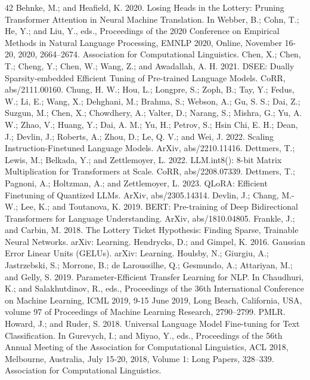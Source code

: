 \documentclass[11pt,a4paper]{article}
\begin{document}
\begin{thebibliography}{42}
 Behnke, M.; and Heafield, K. 2020. Losing Heads in the Lottery: Pruning Transformer Attention in Neural Machine Translation. In Webber, B.; Cohn, T.; He, Y.; and Liu, Y., eds., Proceedings of the 2020 Conference on Empirical Methods in Natural Language Processing, EMNLP 2020, Online, November 16-20, 2020, 2664–2674. Association for Computational Linguistics.
 Chen, X.; Chen, T.; Cheng, Y.; Chen, W.; Wang, Z.; and Awadallah, A. H. 2021. DSEE: Dually Sparsity-embedded Efficient Tuning of Pre-trained Language Models. CoRR, abs/2111.00160.
 Chung, H. W.; Hou, L.; Longpre, S.; Zoph, B.; Tay, Y.; Fedus, W.; Li, E.; Wang, X.; Dehghani, M.; Brahma, S.; Webson, A.; Gu, S. S.; Dai, Z.; Suzgun, M.; Chen, X.; Chowdhery, A.; Valter, D.; Narang, S.; Mishra, G.; Yu, A. W.; Zhao, V.; Huang, Y.; Dai, A. M.; Yu, H.; Petrov, S.; Hsin Chi, E. H.; Dean, J.; Devlin, J.; Roberts, A.; Zhou, D.; Le, Q. V.; and Wei, J. 2022. Scaling Instruction-Finetuned Language Models. ArXiv, abs/2210.11416.
 Dettmers, T.; Lewis, M.; Belkada, Y.; and Zettlemoyer, L. 2022. LLM.int8(): 8-bit Matrix Multiplication for Transformers at Scale. CoRR, abs/2208.07339.
 Dettmers, T.; Pagnoni, A.; Holtzman, A.; and Zettlemoyer, L. 2023. QLoRA: Efficient Finetuning of Quantized LLMs. ArXiv, abs/2305.14314.
 Devlin, J.; Chang, M.-W.; Lee, K.; and Toutanova, K. 2019. BERT: Pre-training of Deep Bidirectional Transformers for Language Understanding. ArXiv, abs/1810.04805.
 Frankle, J.; and Carbin, M. 2018. The Lottery Ticket Hypothesis: Finding Sparse, Trainable Neural Networks. arXiv: Learning.
 Hendrycks, D.; and Gimpel, K. 2016. Gaussian Error Linear Units (GELUs). arXiv: Learning.
 Houlsby, N.; Giurgiu, A.; Jastrzebski, S.; Morrone, B.; de Laroussilhe, Q.; Gesmundo, A.; Attariyan, M.; and Gelly, S. 2019. Parameter-Efficient Transfer Learning for NLP. In Chaudhuri, K.; and Salakhutdinov, R., eds., Proceedings of the 36th International Conference on Machine Learning, ICML 2019, 9-15 June 2019, Long Beach, California, USA, volume 97 of Proceedings of Machine Learning Research, 2790–2799. PMLR.
 Howard, J.; and Ruder, S. 2018. Universal Language Model Fine-tuning for Text Classification. In Gurevych, I.; and Miyao, Y., eds., Proceedings of the 56th Annual Meeting of the Association for Computational Linguistics, ACL 2018, Melbourne, Australia, July 15-20, 2018, Volume 1: Long Papers, 328–339. Association for Computational Linguistics.

\end{thebibliography}
\end{document}
